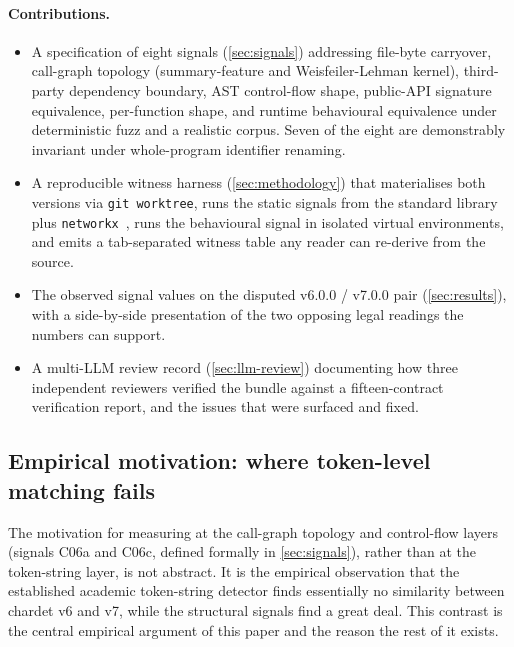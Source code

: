 \documentclass[11pt,letterpaper]{article}
\begin{document}
\paragraph{Contributions.}
\begin{itemize}[leftmargin=*,nosep]
  \item A specification of eight signals (\cref{sec:signals}) addressing
    file-byte carryover, call-graph topology (summary-feature and
    Weisfeiler-Lehman kernel), third-party dependency
    boundary, AST control-flow shape, public-API signature
    equivalence, per-function shape, and runtime behavioural
    equivalence under deterministic fuzz and a realistic corpus.
    Seven of the eight are demonstrably invariant
    under whole-program identifier renaming.
  \item A reproducible witness harness (\cref{sec:methodology}) that
    materialises both versions via \texttt{git worktree}, runs the
    static signals from the standard library plus
    \texttt{networkx}~\cite{networkx}, runs the behavioural signal in
    isolated virtual environments, and emits a tab-separated witness
    table any reader can re-derive from the source.
  \item The observed signal values on the disputed v6.0.0 / v7.0.0
    pair (\cref{sec:results}), with a side-by-side presentation of
    the two opposing legal readings the numbers can support.
  \item A multi-LLM review record (\cref{sec:llm-review}) documenting
    how three independent reviewers verified the bundle against a
    fifteen-contract verification report, and the issues that were
    surfaced and fixed.
\end{itemize}

\subsection{Empirical motivation: where token-level matching fails}
\label{sec:jplag-empirical-motivation}

The motivation for measuring at the call-graph topology and
control-flow layers (signals C06a and C06c, defined formally in
\cref{sec:signals}), rather than at the token-string layer, is not
abstract. It is the empirical observation that the established
academic token-string detector finds essentially no similarity
between chardet v6 and v7, while the structural signals find a great
deal. This contrast is the central empirical argument of this paper
and the reason the rest of it exists.
\end{document}
